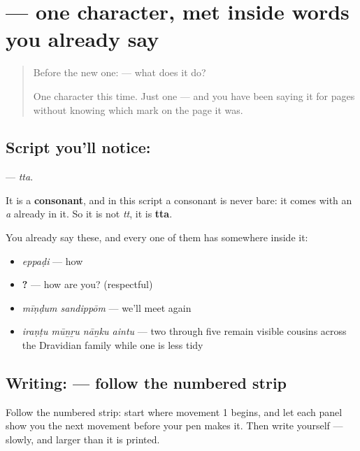 \section[\texorpdfstring{\ta{ட} (tta)}{ட (tta)}]{ — one character, met inside words you already say}

\label{lesson:TA-S118-letter-tta}



\begin{quote}
Before the new one:  — what does it do?

One character this time. Just one — and you have been saying it for pages without knowing which mark on the page it was.
\end{quote}

\subsection*{Script you'll notice: }
\textbf{} — \emph{tta}.

It is a \textbf{consonant}, and in this script a consonant is never bare: it comes with an \emph{a} already in it. So it is not \emph{tt}, it is \textbf{tta}.

You already say these, and every one of them has  somewhere inside it:

\begin{itemize}
\raggedright
  \item \textbf{} \emph{eppaḍi} — how
  \item \textbf{  ?} — how are you? (respectful)
  \item \textbf{ } \emph{mīṇḍum sandippōm} — we'll meet again
  \item \textbf{   } \emph{iraṇṭu mūṉṟu nāṉku aintu} — two through five remain visible cousins across the Dravidian family while one is less tidy
\end{itemize}

\subsection*{Writing:  — follow the numbered strip}

Follow the numbered strip: start where movement 1 begins, and let each panel show you the next movement before your pen makes it. Then write  yourself — slowly, and larger than it is printed.

